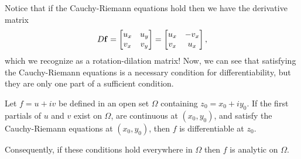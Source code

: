 \documentclass[../m136main.tex]{subfiles}
\begin{document}
Notice that if the Cauchy-Riemann equations hold then we have the derivative matrix
\[ D \mathbf{f} = \begin{bmatrix} u_x & u_y \\ v_x & v_y \end{bmatrix} = \begin{bmatrix} u_x & -v_x \\ v_x & u_x \end{bmatrix}, \]
which we recognize as a rotation-dilation matrix!
Now, we can see that satisfying the Cauchy-Riemann equations is a necessary condition for differentiability, but they are only one part of a sufficient condition.

\begin{theorem}
    Let $f = u + iv$ be defined in an open set $\Omega$ containing $z_0 = x_0 + iy_0$.
    If the first partials of $u$ and $v$ exist on $\Omega$, are continuous at $(x_0,y_0)$, and satisfy the Cauchy-Riemann equations at $(x_0,y_0)$, then $f$ is differentiable at $z_0$.

    Consequently, if these conditions hold everywhere in $\Omega$ then $f$ is analytic on $\Omega$.
\end{theorem}
\end{document}
